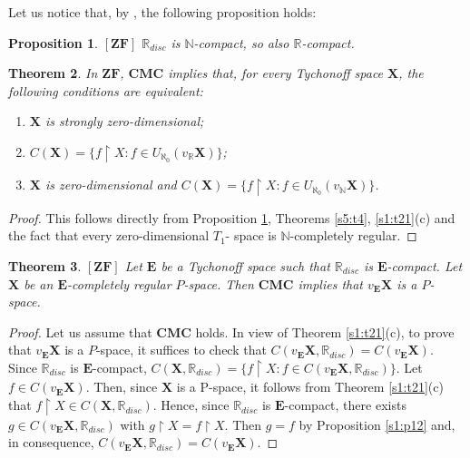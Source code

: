 \documentclass[12pt,twoside,leqno]{article}
\theoremstyle{plain}
\newtheorem{theorem}{Theorem}[section]
\newtheorem{proposition}[theorem]{Proposition}
\theoremstyle{definition}
\theoremstyle{remark}
\begin{document}
Let us notice that, by \cite[the hint to Exercise 3.1 H(a)]{en}, the following proposition holds:

\begin{proposition}
	\label{s5:p5}
	$[\mathbf{ZF}]$ $\mathbb{R}_{disc}$ is $\mathbb{N}$-compact, so also $\mathbb{R}$-compact.
\end{proposition}

\begin{theorem}
	\label{s5:t6}
	In $\mathbf{ZF}$,  $\mathbf{CMC}$ implies that, for every Tychonoff space $\mathbf{X}$, the following conditions are equivalent:
	\begin{enumerate}
		\item[(i)] $\mathbf{X}$ is strongly zero-dimensional;
		\item[(ii)] $C(\mathbf{X})=\{f\upharpoonright X: f\in U_{\aleph_0}(v_{\mathbb{R}}\mathbf{X})\}$;
		\item[(iii)] $\mathbf{X}$ is zero-dimensional and $C(\mathbf{X})=\{f\upharpoonright X: f\in U_{\aleph_0}(v_{\mathbb{N}}\mathbf{X})\}$.
	\end{enumerate}
\end{theorem}
\begin{proof}
	This follows directly from Proposition \ref{s5:p5}, Theorems \ref{s5:t4}, \ref{s1:t21}(c) and the fact that every zero-dimensional $T_1$- space is $\mathbb{N}$-completely regular.
\end{proof}

\begin{theorem}
	\label{s5:t7}
	$[\mathbf{ZF}]$ Let $\mathbf{E}$ be a Tychonoff space such that $\mathbb{R}_{disc}$ is $\mathbf{E}$-compact. Let $\mathbf{X}$ be an $\mathbf{E}$-completely regular $P$-space. Then $\mathbf{CMC}$ implies that $v_{\mathbf{E}}\mathbf{X}$ is a $P$-space.
\end{theorem}
\begin{proof}
	Let us assume that $\mathbf{CMC}$ holds. In view of Theorem \ref{s1:t21}(c), to prove that $v_{\mathbf{E}}\mathbf{X}$ is a $P$-space, it suffices to check that $C(v_{\mathbf{E}}\mathbf{X}, \mathbb{R}_{disc})=C(v_{\mathbf{E}}\mathbf{X})$. Since $\mathbb{R}_{disc}$ is $\mathbf{E}$-compact, $C(\mathbf{X}, \mathbb{R}_{disc})=\{f\upharpoonright X: f\in C(v_{\mathbf{E}}\mathbf{X}, \mathbb{R}_{disc})\}$. Let $f\in C(v_{\mathbf{E}}\mathbf{X})$. Then, since $\mathbf{X}$ is a P-space, it follows from Theorem \ref{s1:t21}(c) that $f\upharpoonright X\in C(\mathbf{X}, \mathbb{R}_{disc})$. Hence, since $\mathbb{R}_{disc}$ is $\mathbf{E}$-compact, there exists $g\in C(v_{\mathbf{E}}\mathbf{X}, \mathbb{R}_{disc})$ with $g\upharpoonright X=f\upharpoonright X$. Then $g=f$ by Proposition \ref{s1:p12} and, in consequence,  $C(v_{\mathbf{E}}\mathbf{X}, \mathbb{R}_{disc})=C(v_{\mathbf{E}}\mathbf{X})$.
\end{proof}
\end{document}
